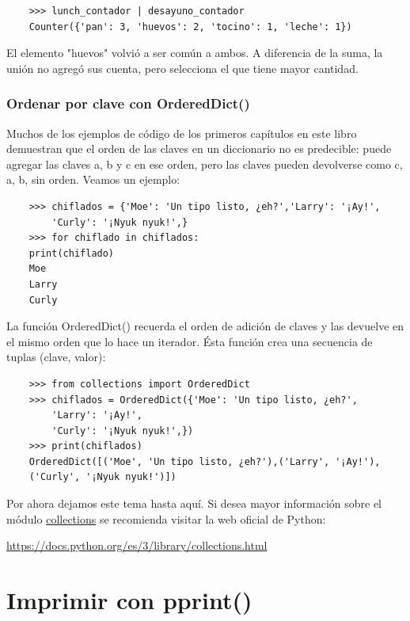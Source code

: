 \begin{lstlisting}
	>>> lunch_contador | desayuno_contador
	Counter({'pan': 3, 'huevos': 2, 'tocino': 1, 'leche': 1})
\end{lstlisting}

El elemento {}"{}huevos{}"{} volvió a ser común a ambos. A diferencia de la suma, la unión no agregó sus
cuenta, pero selecciona  el que tiene mayor cantidad.

\subsubsection{Ordenar por clave con OrderedDict()}

Muchos de los ejemplos de código de los primeros capítulos en este libro demuestran que el
orden de las claves en un diccionario no es predecible: puede agregar las claves a, b y c en ese
orden, pero las claves  pueden devolverse como c, a, b, sin orden. Veamos un ejemplo:

\begin{lstlisting}	
	>>> chiflados = {'Moe': 'Un tipo listo, ¿eh?','Larry': '¡Ay!',
		'Curly': '¡Nyuk nyuk!',}
	>>> for chiflado in chiflados:
	print(chiflado)
	Moe
	Larry
	Curly
\end{lstlisting}

La función  {\ttfamily OrderedDict()} recuerda el orden de adición de claves y las devuelve en el mismo
orden que lo hace un iterador. Ésta función crea una secuencia de tuplas (clave, valor):

\begin{lstlisting}
	>>> from collections import OrderedDict
	>>> chiflados = OrderedDict({'Moe': 'Un tipo listo, ¿eh?',
		'Larry': '¡Ay!',
		'Curly': '¡Nyuk nyuk!',})
	>>> print(chiflados)
	OrderedDict([('Moe', 'Un tipo listo, ¿eh?'),('Larry', '¡Ay!'),
	('Curly', '¡Nyuk nyuk!')])
\end{lstlisting}


Por ahora dejamos este tema hasta aquí. Si desea mayor información sobre el módulo  \href{https://docs.python.org/es/3/library/collections.html#:~:text=Es%20una%20colecci%C3%B3n%20donde%20los,conteos%20de%20cero%20o%20negativos.}{\color{vino} {\ttfamily collections}} se recomienda visitar la web oficial de Python:   

\href{https://docs.python.org/es/3/library/collections.html}{\color{vino} {\ttfamily https://docs.python.org/es/3/library/collections.html}}


\section{Imprimir con pprint()}


